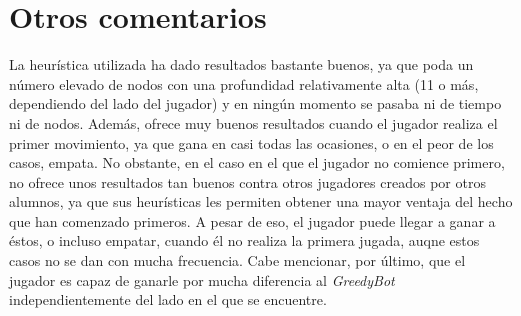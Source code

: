 \documentclass{article}
\begin{document}
  \section{Otros comentarios} 
  La heurística utilizada ha dado resultados bastante buenos, ya que poda un número elevado de nodos con una profundidad relativamente alta (11 o más, dependiendo del lado del jugador) y en ningún momento se pasaba ni de tiempo ni de nodos. Además, ofrece muy buenos resultados cuando el jugador realiza el primer movimiento, ya que gana en casi todas las ocasiones, o en el peor de los casos, empata. No obstante, en el caso en el que el jugador no comience primero, no ofrece unos resultados tan buenos contra otros jugadores creados por otros alumnos, ya que sus heurísticas les permiten obtener una mayor ventaja del hecho que han comenzado primeros. A pesar de eso, el jugador puede llegar a ganar a éstos, o incluso empatar, cuando él no realiza la primera jugada, auqne estos casos no se dan con mucha frecuencia. Cabe mencionar, por último, que el jugador es capaz de ganarle por mucha diferencia al \textit{GreedyBot} independientemente del lado en el que se encuentre. 
\end{document}
